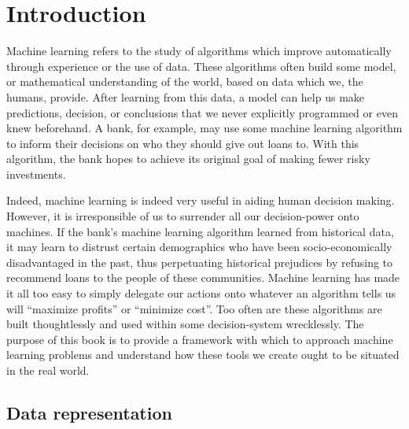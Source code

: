 \chapter{Introduction}

Machine learning refers to the study of algorithms which improve automatically through experience or the use of data. These algorithms often build some model, or mathematical understanding of the world, based on data which we, the humans, provide. After learning from this data, a model can help us make predictions, decision, or conclusions that we never explicitly programmed or even knew beforehand. A bank, for example, may use some machine learning algorithm to inform their decisions on who they should give out loans to. With this algorithm, the bank hopes to achieve its original goal of making fewer risky investments.

Indeed, machine learning is indeed very useful in aiding human decision making. However, it is irresponsible of us to surrender all our decision-power onto machines. If the bank's machine learning algorithm learned from historical data, it may learn to distrust certain demographics who have been socio-economically disadvantaged in the past, thus perpetuating historical prejudices by refusing to recommend loans to the people of these communities. Machine learning has made it all too easy to simply delegate our actions onto whatever an algorithm tells us will ``maximize profits'' or ``minimize cost''. Too often are these algorithms are built thoughtlessly and used within some decision-system wrecklessly. The purpose of this book is to provide a framework with which to approach machine learning problems and understand how these tools we create ought to be situated in the real world.

\section{Data representation}

